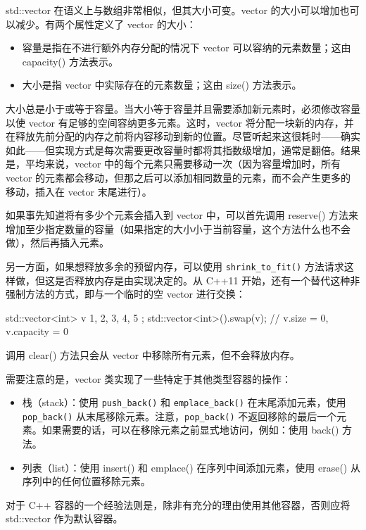 std::vector 在语义上与数组非常相似，但其大小可变。vector 的大小可以增加也可以减少。有两个属性定义了 vector 的大小：

\begin{itemize}
\item
容量是指在不进行额外内存分配的情况下 vector 可以容纳的元素数量；这由 capacity() 方法表示。

\item
大小是指 vector 中实际存在的元素数量；这由 size() 方法表示。
\end{itemize}

大小总是小于或等于容量。当大小等于容量并且需要添加新元素时，必须修改容量以使 vector 有足够的空间容纳更多元素。这时，vector 将分配一块新的内存，并在释放先前分配的内存之前将内容移动到新的位置。尽管听起来这很耗时——确实如此——但实现方式是每次需要更改容量时都将其指数级增加，通常是翻倍。结果是，平均来说，vector 中的每个元素只需要移动一次（因为容量增加时，所有 vector 的元素都会移动，但那之后可以添加相同数量的元素，而不会产生更多的移动，插入在 vector 末尾进行）。

如果事先知道将有多少个元素会插入到 vector 中，可以首先调用 reserve() 方法来增加至少指定数量的容量（如果指定的大小小于当前容量，这个方法什么也不会做），然后再插入元素。

另一方面，如果想释放多余的预留内存，可以使用 \verb|shrink_to_fit()| 方法请求这样做，但这是否释放内存是由实现决定的。从 C++11 开始，还有一个替代这种非强制方法的方式，即与一个临时的空 vector 进行交换：

\begin{cpp}
std::vector<int> v{ 1, 2, 3, 4, 5 };
std::vector<int>().swap(v); // v.size = 0, v.capacity = 0
\end{cpp}

调用 clear() 方法只会从 vector 中移除所有元素，但不会释放内存。

需要注意的是，vector 类实现了一些特定于其他类型容器的操作：

\begin{itemize}
\item
栈（stack）：使用 \verb|push_back()| 和 \verb|emplace_back()| 在末尾添加元素，使用 \verb|pop_back()| 从末尾移除元素。注意，\verb|pop_back()| 不返回移除的最后一个元素。如果需要的话，可以在移除元素之前显式地访问，例如：使用 back() 方法。

\item
列表（list）：使用 insert() 和 emplace() 在序列中间添加元素，使用 erase() 从序列中的任何位置移除元素。
\end{itemize}

\begin{myTip}
对于 C++ 容器的一个经验法则是，除非有充分的理由使用其他容器，否则应将 std::vector 作为默认容器。
\end{myTip}

